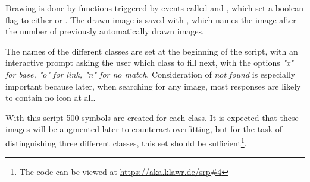Drawing is done by functions triggered by events called  and , which set a boolean  flag to either  or .
The drawn image is saved with , which names the image after the number of previously automatically drawn images.

The names of the different classes are set at the beginning of the script, with an interactive prompt asking the user which class to fill next, with the options \textit{"x" for base, "o" for link, "n" for no match}.
Consideration of \textit{not found} is especially important because later, when searching for any image, most responses are likely to contain no icon at all.

With this script 500 symbols are created for each class.
It is expected that these images will be augmented later to counteract overfitting, but for the task of distinguishing three different classes, this set should be sufficient\footnote{The code can be viewed at \url{https://aka.klawr.de/srp\#4}}.

